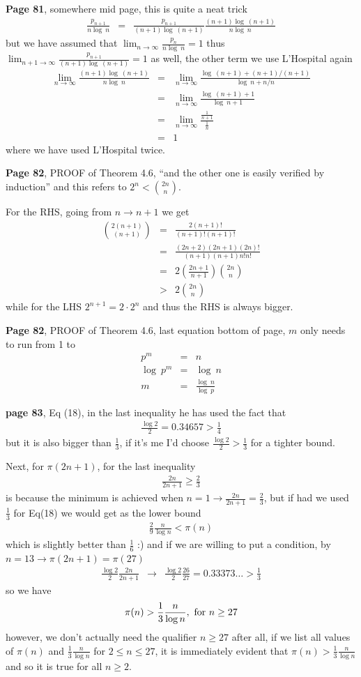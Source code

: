 \documentclass[aps,preprint,preprintnumbers,nofootinbib,showpacs,prd]{revtex4-1}
\newcommand{\nbea}{\begin{eqnarray*}}
\newcommand{\neea}{\end{eqnarray*}}
\begin{document}
{\bf Page 81}, somewhere mid page, this is quite a neat trick
%
\nbea
\frac{p_{n+1}}{n\log~n} & = & \frac{p_{n+1}}{(n+1)\log~(n+1)} \frac{(n+1)\log~(n+1)}{n\log~n}
\neea
%
but we have assumed that $\lim_{n\to\infty}\frac{p_{n}}{n\log~n} = 1$ thus $\lim_{n+1\to\infty}\frac{p_{n+1}}{(n+1)\log~(n+1)} = 1$ as well, the other term we use L'Hospital again
%
\nbea
\lim_{n\to\infty} \frac{(n+1)\log~(n+1)}{n\log~n} & = & \lim_{n\to\infty} \frac{\log~(n+1) + (n+1)/(n+1)}{\log~n + n/n} \\
& = & \lim_{n\to\infty} \frac{\log~(n+1) + 1}{\log~n+1} \\
& = & \lim_{n\to\infty} \frac{\frac{1}{n+1}}{\frac{1}{n}} \\
& = & 1
\neea
%
where we have used L'Hospital twice.

{\bf Page 82}, PROOF of Theorem 4.6, ``and the other one is easily verified by induction'' and this refers to $2^n < {2n \choose n}$.

For the RHS, going from $n\to n+1$ we get
%
\nbea
{2(n+1) \choose (n+1)} & = & \frac{2(n+1)!}{(n+1)!(n+1)!} \\
& = & \frac{(2n+2)(2n+1)(2n)!}{(n+1)(n+1)n!n!} \\
& = & 2 \left(\frac{2n+1}{n+1}\right ){2n \choose n} \\
& > & 2 {2n \choose n}
\neea
%
while for the LHS $2^{n+1} = 2\cdot 2^n$ and thus the RHS is always bigger.

{\bf Page 82}, PROOF of Theorem 4.6, last equation bottom of page, $m$ only needs to run from 1 to
%
\nbea
p^m & = & n \\
\log~p^m & = & \log~n \\
m & = & \frac{\log~n}{\log~p}
\neea
%

{\bf page 83}, Eq (18), in the last inequality he has used the fact that
%
\nbea
\frac{\log 2}{2} = 0.34657 > \frac{1}{4}
\neea
%
but it is also bigger than $\frac{1}{3}$, if it's me I'd choose $\frac{\log 2}{2} > \frac{1}{3}$ for a tighter bound.

Next, for $\pi(2n+1)$, for the last inequality
%
\nbea
\frac{2n}{2n+1} \ge \frac{2}{3}
\neea
%
is because the minimum is achieved when $n=1 \to \frac{2n}{2n+1} = \frac{2}{3}$, but if had we used $\frac{1}{3}$ for Eq(18) we would get as the lower bound
%
\nbea
\frac{2}{9} \frac{n}{\log n} < \pi(n)
\neea
%
which is slightly better than $\frac{1}{6}$ :) and if we are willing to put a condition, by $n=13\to \pi(2n+1) = \pi(27)$
%
\nbea
\frac{\log2}{2}\frac{2n}{2n+1} & \to & \frac{\log2}{2}\frac{26}{27} = 0.33373\ldots > \frac{1}{3}
\neea
%
so we have
%
\nbea
\pi(n) > \frac{1}{3}\frac{n}{\log n}, ~{\rm for}~n\ge27
\neea
%
however, we don't actually need the qualifier $n\ge27$ after all, if we list all values of $\pi(n)$ and $\frac{1}{3}\frac{n}{\log n}$ for $2 \le n \le 27$, it is immediately evident that $\pi(n) > \frac{1}{3}\frac{n}{\log n}$ and so it is true for all $n \ge 2$.
\end{document}
